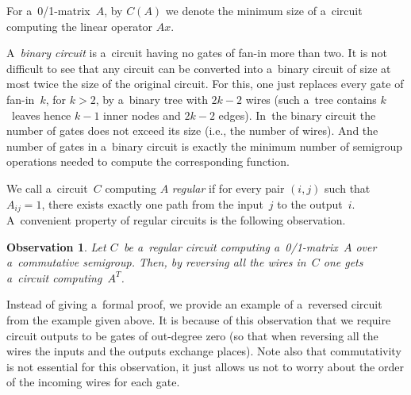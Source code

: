 \documentclass[11pt,letterpaper]{article}
\newtheorem{observation}{Observation}
\begin{document}
For a~0/1-matrix~$A$, by $C(A)$ we denote the minimum size of
a~circuit computing the linear operator $Ax$.


A~{\em binary circuit} is a~circuit having no gates of fan-in more than two. It
is not difficult to see that any circuit can be converted into a~binary circuit
of size at most twice the size of the original circuit. For this, one just
replaces every gate of fan-in~$k$, for $k>2$, by a~binary tree with $2k-2$ wires
(such a~tree contains $k$~leaves hence $k-1$ inner nodes and $2k-2$ edges). 
In~the binary circuit the number of gates does not exceed its size
(i.e., the number of wires). And the number of gates in a~binary
circuit is
exactly the minimum number of semigroup operations needed to 
compute the
corresponding function.

We call a~circuit~$C$ computing $A$ \emph{regular} if for every pair $(i,j)$ such that $A_{ij}=1$, there exists exactly one path from the input~$j$ to the output~$i$. A~convenient property of regular circuits is the following observation.

\begin{observation}\label{obs:transpose}
Let $C$~be a~regular circuit computing a~0/1-matrix~$A$ over a~commutative semigroup. Then, by reversing all the wires in~$C$ one gets a~circuit computing~$A^T$. 
\end{observation}
Instead of giving a~formal proof, we provide an example of a~reversed circuit from the example given above. It is because of this observation that we require circuit outputs to be gates of out-degree zero (so that when reversing all the wires the inputs and the outputs exchange places). Note also that commutativity is not essential for this observation, it just allows us not to worry about the order of the incoming wires for each gate.
\end{document}
